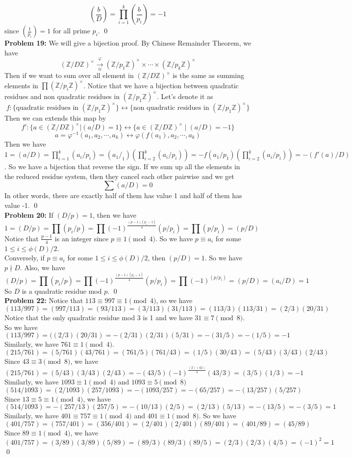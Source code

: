 \documentclass[12pt]{amsart}
\newcommand{\Z}{\mathbb{Z}}
\begin{document}
\[(\frac{b}{D})=\prod_{i=1}^k(\frac{b}{p_i})=-1\]
since $(\frac{1}{p_i})=1$ for all prime $p_i$.
\qed\\
\textbf{Problem 19:} We will give a bijection proof. By Chinese Remainder Theorem, we have 
\[(\Z/D\Z)^\times \xrightarrow[\cong]{\varphi}  (\Z/p_1\Z)^\times \times  \cdots \times (\Z/p_k\Z)^\times \]
Then if we want to sum over all element in $(\Z/D\Z)^\times$ is the same as summing elements in $\prod (\Z/p_i\Z)^\times$. Notice that we have a bijection between quadratic residues and non quadratic residues in $(\Z/p_1\Z)^\times$. Let's denote it as 
\[f:\{\text{quadratic residues in }(\Z/p_1\Z)^\times \}\leftrightarrow\{\text{non quadratic residues in }(\Z/p_1\Z)^\times \}\]
Then we can extends this map by 
\[f':\{a\in (\Z/D\Z)^\times | (a/D)=1 \}\leftrightarrow\{a\in (\Z/D\Z)^\times\mid (a/D)=-1  \}\]
\[a=\varphi^{-1}(a_1,a_2,\cdots,a_k)\leftrightarrow \varphi(f(a_1),a_2,\cdots,a_k)\]
Then we have $1=(a/D)=\prod_{i=1}^k(a_i/p_i)=(a_1/_1)(\prod_{i=2}^k(a_i/p_i))=-f(a_1/p_1)(\prod_{i=2}^k(a_i/p_i))=-(f'(a)/D)$. So we have a bijection that reverse the sign. If we sum up all the elements in the reduced residue system, then they cancel each other pairwise and we get 
\[\sum(a/D)=0\]
In other words, there are exactly half of them has value 1 and half of them has value -1.
\qed\\
\textbf{Problem 20:} If $(D/p)=1$, then we have 
\[1=(D/p)=\prod(p_i/p)=\prod (-1)^{\frac{(p-1)(p_i-1)}{4}}(p/p_i)=\prod(p/p_i)=(p/D)\]
Notice that $\frac{p-1}{4}$ is an integer since $p\equiv 1\pmod 4$. So we have $p\equiv a_i$ for some $1\leq i\leq \phi(D)/2$.\\
Conversely, if $p\equiv a_i$ for some $1\leq i\leq \phi(D)/2$, then $(p/D)=1$. So we have $p\nmid D$. Also, we have 
\[(D/p)=\prod(p_i/p)=\prod(-1)^{\frac{(p-1)(p_i-1)}{4}}(p/p_i)=\prod(-1)^(p/p_i)=(p/D)=(a_i/D)=1\]
So $D$ is a quadratic residue mod $p$.
\qed\\
\textbf{Problem 22:} Notice that $113\equiv 997\equiv 1\pmod 4$, so we have 
\[(113/997)=(997/113)=(93/113)=(3/113)(31/113)=(113/3)(113/31)=(2/3)(20/31)\]
Notice that the only quadratic residue mod 3 is 1 and we have $31\equiv 7\pmod 8$.
So we have 
\[(113/997)=((2/3)(20/31)=-(2/31)(2/31)(5/31)=-(31/5)=-(1/5)=-1\]
Similarly, we have $761\equiv 1\pmod 4$.
\[(215/761)=(5/761)(43/761)=(761/5)(761/43)=(1/5)(30/43)=(5/43)(3/43)(2/43)\]
Since $43\equiv 3\pmod 8$, we have 
\[(215/761)=(5/43)(3/43)(2/43)=-(43/5)(-1)^{\frac{(2)(42)}{4}}(43/3)=(3/5)(1/3)=-1\]
Similarly, we have $1093\equiv 1\pmod 4$ and $1093\equiv 5\pmod 8$
\[(514/1093)=(2/1093)(257/1093)=-(1093/257)=-(65/257)=-(13/257)(5/257)\]
Since $13\equiv 5\equiv 1\pmod 4$, we have 
\[(514/1093)=-(257/13)(257/5)=-(10/13)(2/5)=(2/13)(5/13)=-(13/5)=-(3/5)=1\]
Similarly, we have $401\equiv 757\equiv 1\pmod 4$ and $401\equiv 1\pmod 8$. So we have 
\[(401/757)=(757/401)=(356/401)=(2/401)(2/401)(89/401)=(401/89)=(45/89)\]
Since $89\equiv1\pmod 4$, we have 
\[(401/757)=(3/89)(3/89)(5/89)=(89/3)(89/3)(89/5)=(2/3)(2/3)(4/5)=(-1)^2=1\]
\qed\\
\end{document}

